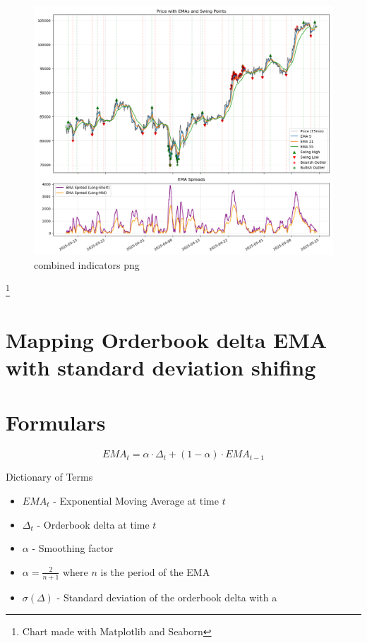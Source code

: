 \documentclass[12pt]{article}
\begin{document}
\begin{figure}[H]
    \centering
    \includegraphics[width=\textwidth]{imgs/swingpoints_emaspread_priceOutliers.png}
    \caption{combined indicators png}
\end{figure}

\footnote{Chart made with Matplotlib and Seaborn}


\newpage
\section{Mapping Orderbook delta EMA with standard deviation shifing}
\section{Formulars}

\begin{equation}
  EMA_t = \alpha \cdot \Delta_t + (1 - \alpha) \cdot EMA_{t-1}
\end{equation}

Dictionary of Terms

\begin{itemize}
  \item $EMA_t$ - Exponential Moving Average at time $t$
  \item $\Delta_t$ - Orderbook delta at time $t$
  \item $\alpha$ - Smoothing factor 
  \item $\alpha = \frac{2}{n+1}$ where $n$ is the period of the EMA
  \item $\sigma(\Delta)$ - Standard deviation of the orderbook delta with a 
\end{itemize}
\end{document}
